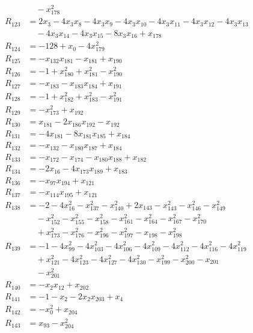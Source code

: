 \begin{align*}
&\quad -x_{178}^{2}\\[2pt]
R_{123}&=2x_{3}-4x_{3}x_{8}-4x_{3}x_{9}-4x_{3}x_{10}-4x_{3}x_{11}-4x_{3}x_{12}-4x_{3}x_{13}\\
&\quad -4x_{3}x_{14}-4x_{3}x_{15}-8x_{3}x_{16}+x_{178}\\[2pt]
R_{124}&=-128+x_{0}-4x_{179}^{2}\\[2pt]
R_{125}&=-x_{132}x_{181}-x_{181}+x_{190}\\[2pt]
R_{126}&=-1+x_{180}^{2}+x_{181}^{2}-x_{190}^{2}\\[2pt]
R_{127}&=-x_{183}-x_{183}x_{184}+x_{191}\\[2pt]
R_{128}&=-1+x_{182}^{2}+x_{183}^{2}-x_{191}^{2}\\[2pt]
R_{129}&=-x_{173}^{2}+x_{192}\\[2pt]
R_{130}&=x_{181}-2x_{186}x_{192}-x_{192}\\[2pt]
R_{131}&=-4x_{181}-8x_{181}x_{185}+x_{184}\\[2pt]
R_{132}&=-x_{132}-x_{180}x_{187}+x_{184}\\[2pt]
R_{133}&=-x_{172}-x_{174}-x_{180}x_{188}+x_{182}\\[2pt]
R_{134}&=-2x_{16}-4x_{173}x_{189}+x_{183}\\[2pt]
R_{136}&=-x_{97}x_{194}+x_{121}\\[2pt]
R_{137}&=-x_{114}x_{195}+x_{121}\\[2pt]
R_{138}&=-2-4x_{16}^{2}-x_{137}^{2}-x_{140}^{2}+2x_{143}-x_{143}^{2}-x_{146}^{2}-x_{149}^{2}\\
&\quad -x_{152}^{2}-x_{155}^{2}-x_{158}^{2}-x_{161}^{2}-x_{164}^{2}-x_{167}^{2}-x_{170}^{2}\\
&\quad +x_{173}^{2}-x_{176}^{2}-x_{196}^{2}-x_{197}^{2}-x_{198}-x_{198}^{2}\\[2pt]
R_{139}&=-1-4x_{99}^{2}-4x_{103}^{2}-4x_{106}^{2}-4x_{109}^{2}-4x_{112}^{2}-4x_{116}^{2}-4x_{119}^{2}\\
&\quad +x_{121}^{2}-4x_{123}^{2}-4x_{127}^{2}-4x_{130}^{2}-x_{199}^{2}-x_{200}^{2}-x_{201}\\
&\quad -x_{201}^{2}\\[2pt]
R_{140}&=-x_{2}x_{12}+x_{202}\\[2pt]
R_{141}&=-1-x_{2}-2x_{2}x_{203}+x_{4}\\[2pt]
R_{142}&=-x_{0}^{2}+x_{204}\\[2pt]
R_{143}&=x_{93}-x_{204}^{2}\\[2pt]
\end{align*}\endgroup
